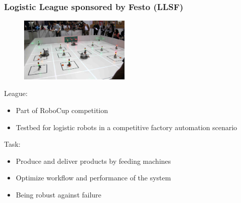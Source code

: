 \documentclass[]{beamer}
\begin{document}
\begin{frame}
\frametitle{Logistic League sponsored by Festo (LLSF)}
\fboxsep=0pt
\noindent%
\begin{minipage}[]{0.48\linewidth}
\begin{figure}
\includegraphics[width=150pt,heigth=120pt]{pics/llsfLeague.png}\\
\end{figure}
\end{minipage}%
\hfill%
\begin{minipage}[]{0.48\linewidth}
League:
\begin{itemize}
\item Part of RoboCup competition
\item Testbed for logistic robots in a competitive factory automation scenario
\end{itemize}
\pause
Task:
\begin{itemize}
\item Produce and deliver products by feeding machines%
\item Optimize workflow and performance of the system
\item Being robust against failure
\end{itemize}
\end{minipage}
\end{frame}
\end{document}
